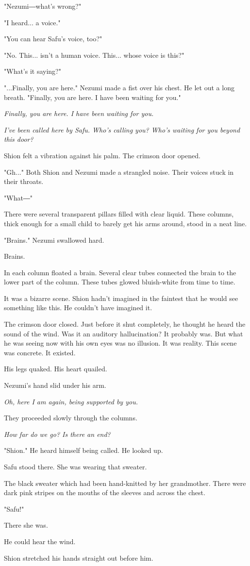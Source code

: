 "Nezumi―what's wrong?"

"I heard... a voice."

"You can hear Safu's voice, too?"

"No. This... isn't a human voice. This... whose voice is this?"

"What's it saying?"

"...Finally, you are here." Nezumi made a fist over his chest. He let
out a long breath. "Finally, you are here. I have been waiting for you."

\emph{Finally, you are here. I have been waiting for you.}

\myspace

\emph{I've been called here by Safu. Who's calling you? Who's waiting for you
beyond this door?}

Shion felt a vibration against his palm. The crimson door opened.

"Gh..." Both Shion and Nezumi made a strangled noise. Their voices stuck
in their throats.

"What―"

There were several transparent pillars filled with clear liquid. These
columns, thick enough for a small child to barely get his arms around,
stood in a neat line.

"Brains." Nezumi swallowed hard.

Brains.

In each column floated a brain. Several clear tubes connected the brain
to the lower part of the column. These tubes glowed bluish-white from
time to time.

It was a bizarre scene. Shion hadn't imagined in the faintest that he
would see something like this. He couldn't have imagined it.

The crimson door closed. Just before it shut completely, he thought he
heard the sound of the wind. Was it an auditory hallucination? It
probably was. But what he was seeing now with his own eyes was no
illusion. It was reality. This scene was concrete. It existed.

His legs quaked. His heart quailed.

Nezumi's hand slid under his arm.

\emph{Oh, here I am again, being supported by you.}

They proceeded slowly through the columns.

\emph{How far do we go? Is there an end?}

"Shion." He heard himself being called. He looked up.

Safu stood there. She was wearing that sweater.

The black sweater which had been hand-knitted by her grandmother. There
were dark pink stripes on the mouths of the sleeves and across the
chest.

"Safu!"

There she was.

He could hear the wind.

Shion stretched his hands straight out before him.